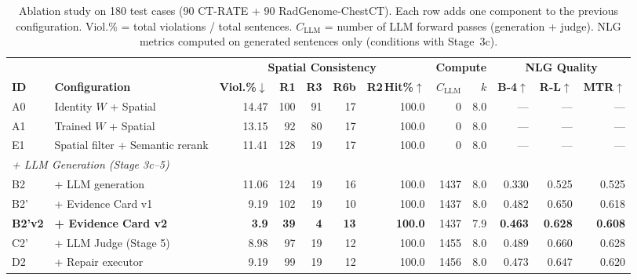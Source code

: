 \documentclass[11pt,a4paper]{article}
\begin{document}
\begin{table}[H]
\centering
\caption{Ablation study on 180 test cases (90 CT-RATE + 90 RadGenome-ChestCT).
Each row adds one component to the previous configuration.
Viol.\% = total violations / total sentences.
$C_\text{LLM}$ = number of LLM forward passes (generation + judge).
NLG metrics computed on generated sentences only (conditions with Stage~3c).}
\label{tab:ablation}
\small
\begin{tabular}{@{}ll rrrrr rr rrr@{}}
\toprule
 & & \multicolumn{5}{c}{\textbf{Spatial Consistency}} & \multicolumn{2}{c}{\textbf{Compute}} & \multicolumn{3}{c}{\textbf{NLG Quality}} \\
\cmidrule(lr){3-7} \cmidrule(lr){8-9} \cmidrule(lr){10-12}
\textbf{ID} & \textbf{Configuration} & \textbf{Viol.\%}$\downarrow$ & \textbf{R1} & \textbf{R3} & \textbf{R6b} & \textbf{R2\,Hit\%}$\uparrow$ & $C_\text{LLM}$ & $k$ & \textbf{B-4}$\uparrow$ & \textbf{R-L}$\uparrow$ & \textbf{MTR}$\uparrow$ \\
\midrule
A0 & Identity $W$ + Spatial & 14.47 & 100 & 91 & 17 & 100.0 & 0 & 8.0 & --- & --- & --- \\
A1 & Trained $W$ + Spatial & 13.15 & 92 & 80 & 17 & 100.0 & 0 & 8.0 & --- & --- & --- \\
E1 & Spatial filter + Semantic rerank & 11.41 & 128 & 19 & 17 & 100.0 & 0 & 8.0 & --- & --- & --- \\
\midrule
\multicolumn{12}{l}{\textit{+ LLM Generation (Stage 3c--5)}} \\
B2 & + LLM generation & 11.06 & 124 & 19 & 16 & 100.0 & 1437 & 8.0 & 0.330 & 0.525 & 0.525 \\
B2' & + Evidence Card v1 & 9.19 & 102 & 19 & 10 & 100.0 & 1437 & 8.0 & 0.482 & 0.650 & 0.618 \\
\textbf{B2'v2} & \textbf{+ Evidence Card v2} & \textbf{3.9} & \textbf{39} & \textbf{4} & \textbf{13} & \textbf{100.0} & 1437 & 7.9 & \textbf{0.463} & \textbf{0.628} & \textbf{0.608} \\
C2' & + LLM Judge (Stage 5) & 8.98 & 97 & 19 & 12 & 100.0 & 1455 & 8.0 & 0.489 & 0.660 & 0.628 \\
D2 & + Repair executor & 9.19 & 99 & 19 & 12 & 100.0 & 1456 & 8.0 & 0.473 & 0.647 & 0.620 \\
\bottomrule
\end{tabular}
\end{table}
\end{document}
